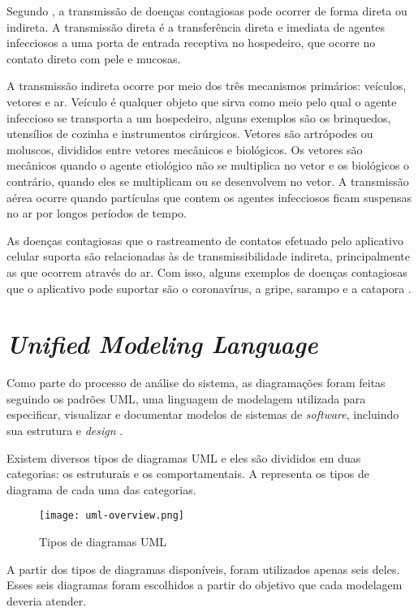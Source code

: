 Segundo \textcite{Duncan2013}, a transmissão de doenças contagiosas pode ocorrer de forma direta ou indireta. A transmissão direta é a transferência direta e imediata de agentes infecciosos a uma porta de entrada receptiva no hospedeiro, que ocorre no contato direto com pele e mucosas. 

A transmissão indireta ocorre por meio dos três mecanismos primários: veículos, vetores e ar. Veículo é qualquer objeto que sirva como meio pelo qual o agente infeccioso se transporta a um hospedeiro, alguns exemplos são os brinquedos, utensílios de cozinha e instrumentos cirúrgicos. Vetores são artrópodes ou moluscos, divididos entre vetores mecânicos e biológicos. Os vetores são mecânicos quando o agente etiológico não se multiplica no vetor e os biológicos o contrário, quando eles se multiplicam ou se desenvolvem no vetor. A transmissão aérea ocorre quando partículas que contem os agentes infecciosos ficam suspensas no ar por longos períodos de tempo.

As doenças contagiosas que o rastreamento de contatos efetuado pelo aplicativo celular suporta são relacionadas às de transmissibilidade indireta, principalmente as que ocorrem através do ar. Com isso, alguns exemplos de doenças contagiosas que o aplicativo pode suportar são o coronavírus, a gripe, sarampo e a catapora \cite{Descomplica}.

\section{\textit{Unified Modeling Language}}\label{sec:uml}
Como parte do processo de análise do sistema, as diagramações foram feitas seguindo os padrões UML, uma linguagem de modelagem utilizada para especificar, visualizar e documentar modelos de sistemas de \textit{software}, incluindo sua estrutura e \textit{design} \cite{uml}.

Existem diversos tipos de diagramas UML e eles são divididos em duas categorias: os estruturais e os comportamentais. A  representa os tipos de diagrama de cada uma das categorias.

\begin{figure}[!htb]
    \centering
    \texttt{[image: uml-overview.png]}
    \caption{Tipos de diagramas UML}
    \label{fig:umloverview}
\end{figure}

A partir dos tipos de diagramas disponíveis, foram utilizados apenas seis deles. Esses seis diagramas foram escolhidos a partir do objetivo que cada modelagem deveria atender. 

